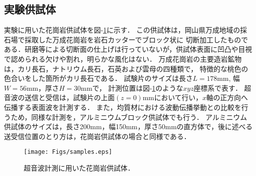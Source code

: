 ﻿%
\subsection{実験供試体}
実験に用いた花崗岩供試体を図-\ref{fig:fig1}に示す．
この供試体は，岡山県万成地域の採石場で採取した万成花崗岩を岩石カッターでブロック状に
切断加工したものである．研磨等による切断面の仕上げは行っていないが，供試体表面に凹凸や目視で認められる欠けや割れ，明らかな風化はない．
万成花崗岩の主要造岩鉱物は，カリ長石，ナトリウム長石，石英および雲母の四種類で，
特徴的な桃色の色合いをした箇所がカリ長石である．
試験片のサイズは長さ$L=178$mm, 幅$W=56$mm，厚さ$H=30$mmで，
計測位置は図-\ref{fig:fig1}のような$xyz$座標系で表す．
超音波の送信と受信は，試験片の上面$(z=0)$mmにおいて行い，$x$軸の正方向へ伝播する表面波を計測する．
また，均質材における波動伝播挙動との比較を行うため，同様な計測を，アルミニウムブロック供試体でも行う．
アルミニウム供試体のサイズは，長さ200mm，幅150mm，厚さ50mmの直方体で，後に述べる送受信位置のとり方は，花崗岩供試体の場合と同様である．
\begin{figure}
\begin{center}
\texttt{[image: Figs/samples.eps]}
\caption{
	超音波計測に用いた花崗岩供試体．
}
\label{fig:fig1}
\end{center}
\end{figure}
